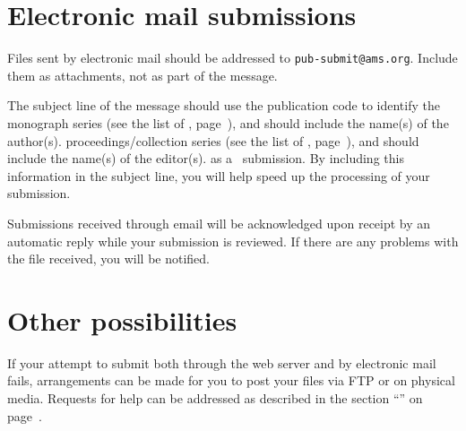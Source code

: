 \section{Electronic mail submissions}
\noindent
Files sent by electronic mail should be addressed to
\texttt{pub-submit@ams.org}.  Include them as attachments, not as
part of the message.

The subject line of the message should use the publication code to identify the
{monograph series (see the list of \textit{},
 page~\pageref{tbl:series}), and should include the name(s) of the author(s).}
{proceedings/collection series (see the list of \textit{},
 page~\pageref{tbl:series}), and should include the name(s) of the editor(s).}
{as a \Memos\ submission.}
By including this information in the subject line, you will help speed up
the processing of your submission.

Submissions received through email will be acknowledged upon receipt by an
automatic reply while your submission is reviewed.  If there are any problems
with the file received, you will be notified.

\section{Other possibilities}
\noindent If your attempt to submit both through the web server and by
electronic mail fails, arrangements can be made for you to post your
files via FTP or on physical media.  Requests for help can be addressed
as described in the section ``'' on
page~\pageref{sec:amsresources}.

\endinput
